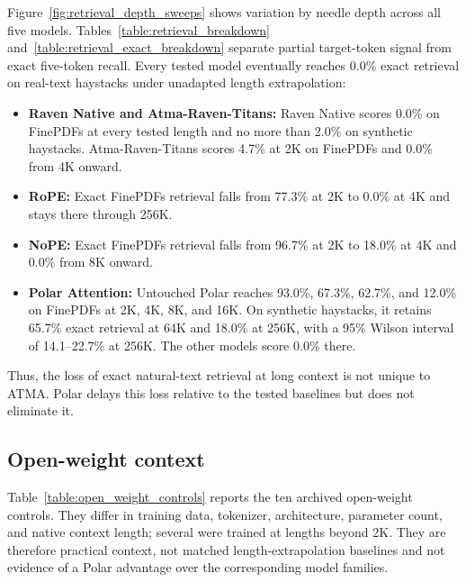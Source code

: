 Figure~\ref{fig:retrieval_depth_sweeps} shows variation by needle depth across all five models. Tables~\ref{table:retrieval_breakdown} and~\ref{table:retrieval_exact_breakdown} separate partial target-token signal from exact five-token recall. Every tested model eventually reaches 0.0\% exact retrieval on real-text haystacks under unadapted length extrapolation:
\begin{itemize}
\item \textbf{Raven Native and Atma-Raven-Titans:} Raven Native scores 0.0\% on FinePDFs at every tested length and no more than 2.0\% on synthetic haystacks. Atma-Raven-Titans scores 4.7\% at 2K on FinePDFs and 0.0\% from 4K onward.
\item \textbf{RoPE:} Exact FinePDFs retrieval falls from 77.3\% at 2K to 0.0\% at 4K and stays there through 256K.
\item \textbf{NoPE:} Exact FinePDFs retrieval falls from 96.7\% at 2K to 18.0\% at 4K and 0.0\% from 8K onward.
\item \textbf{Polar Attention:} Untouched Polar reaches 93.0\%, 67.3\%, 62.7\%, and 12.0\% on FinePDFs at 2K, 4K, 8K, and 16K. On synthetic haystacks, it retains 65.7\% exact retrieval at 64K and 18.0\% at 256K, with a 95\% Wilson interval of 14.1--22.7\% at 256K. The other models score 0.0\% there.
\end{itemize}
Thus, the loss of exact natural-text retrieval at long context is not unique to ATMA. Polar delays this loss relative to the tested baselines but does not eliminate it.

\subsection{Open-weight context}
Table~\ref{table:open_weight_controls} reports the ten archived open-weight controls. They differ in training data, tokenizer, architecture, parameter count, and native context length; several were trained at lengths beyond 2K. They are therefore practical context, not matched length-extrapolation baselines and not evidence of a Polar advantage over the corresponding model families.

